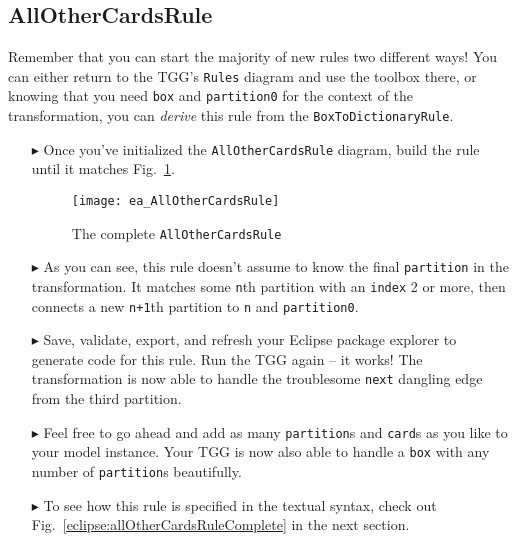 \newpage
\hypertarget{allCards vis}{}
\subsection{AllOtherCardsRule}
\visHeader

Remember that you can start the majority of new rules two different ways! You can either return to the TGG's \texttt{Rules} diagram and use the toolbox
there, or knowing that you need \texttt{box} and \texttt{partition0} for the context of the transformation, you can \emph{derive} this rule from the
\texttt{BoxToDictionaryRule}.

\begin{itemize}

\item[$\blacktriangleright$] Once you've initialized the \texttt{AllOtherCardsRule} diagram, build the rule until it matches
Fig.~\ref{fig:ea_allOtherCardsRuleComplete}.

\begin{figure}[htbp]
\begin{center}
  \texttt{[image: ea\_AllOtherCardsRule]}
  \caption{The complete \texttt{AllOtherCardsRule}}
  \label{fig:ea_allOtherCardsRuleComplete}
\end{center}
\end{figure}

\item[$\blacktriangleright$] As you can see, this rule doesn't assume to know the final \texttt{partition} in the transformation. It matches some
\texttt{n}th partition with an \texttt{index} 2 or more, then connects a new \texttt{n+1}th partition to \texttt{n} and \texttt{partition0}. 

\item[$\blacktriangleright$] Save, validate, export, and refresh your Eclipse package explorer to generate code for this rule. Run the TGG again -- it works!
The transformation is now able to handle the troublesome \texttt{next} dangling edge from the third partition.

\item[$\blacktriangleright$] Feel free to go ahead and add as many \texttt{partition}s and \texttt{card}s as you like to your model instance. Your TGG is now
also able to handle a \texttt{box} with any number of \texttt{partition}s beautifully. 

\item[$\blacktriangleright$] To see how this rule is specified in the textual syntax, check out Fig.~\ref{eclipse:allOtherCardsRuleComplete} in the next
section.


\end{itemize}
